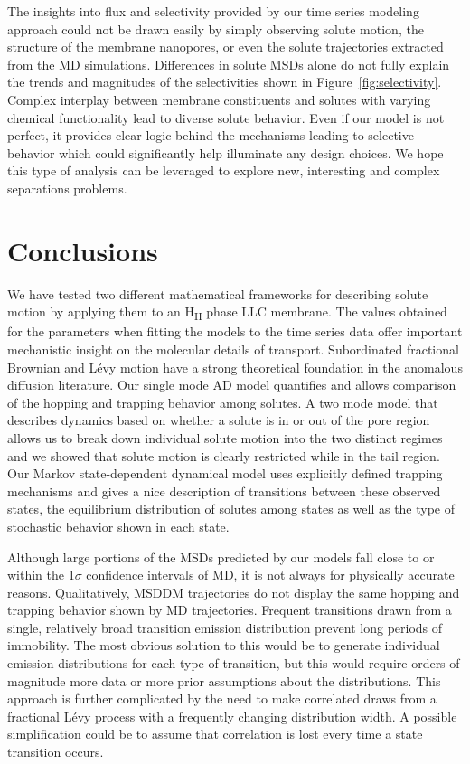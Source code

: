 \documentclass[aps,pre,preprint,groupedaddress,longbibliography]{revtex4-2}
\begin{document}
  The insights into flux and selectivity provided by our time series modeling
  approach could not be drawn easily by simply observing solute motion, the
  structure of the membrane nanopores, or even the solute trajectories
  extracted from the MD simulations. Differences in solute MSDs alone do not
  fully explain the trends and magnitudes of the selectivities shown in
  Figure~\ref{fig:selectivity}. Complex interplay between membrane
  constituents and solutes with varying chemical functionality lead to diverse
  solute behavior. Even if our model is not perfect, it provides clear logic
  behind the mechanisms leading to selective behavior which could significantly
  help illuminate any design choices. We hope this type of analysis can be 
  leveraged to explore new, interesting and complex separations problems.
  
  \section{Conclusions}
  
  We have tested two different mathematical frameworks for describing solute
  motion by applying them to an H\textsubscript{II} phase LLC membrane. The
  values obtained for the parameters when fitting the models to the time series
  data offer important mechanistic insight on the molecular details of
  transport. Subordinated fractional Brownian and L\'evy motion have a strong
  theoretical foundation in the anomalous diffusion literature. Our single mode
  AD model quantifies and allows comparison of the hopping and trapping behavior
  among solutes. A two mode model that describes dynamics based on whether a
  solute is in or out of the pore region allows us to break down individual
  solute motion into the two distinct regimes and we showed that solute motion
  is clearly restricted while in the tail region. Our Markov state-dependent
  dynamical model uses explicitly defined trapping mechanisms and gives a nice
  description of transitions between these observed states, the equilibrium
  distribution of solutes among states as well as the type of stochastic
  behavior shown in each state. 
  
  Although large portions of the MSDs predicted by our models fall close to or
  within the 1$\sigma$ confidence intervals of MD, it is not always for
  physically accurate reasons. Qualitatively, MSDDM trajectories do not display
  the same hopping and trapping behavior shown by MD trajectories. Frequent
  transitions drawn from a single, relatively broad transition emission
  distribution prevent long periods of immobility. The most obvious solution to
  this would be to generate individual emission distributions for each type of
  transition, but this would require orders of magnitude more data or more
  prior assumptions about the distributions. This approach is further
  complicated by the need to make correlated draws from a fractional L\'evy
  process with a frequently changing distribution width. A possible
  simplification could be to assume that correlation is lost every time a state
  transition occurs.
\end{document}
